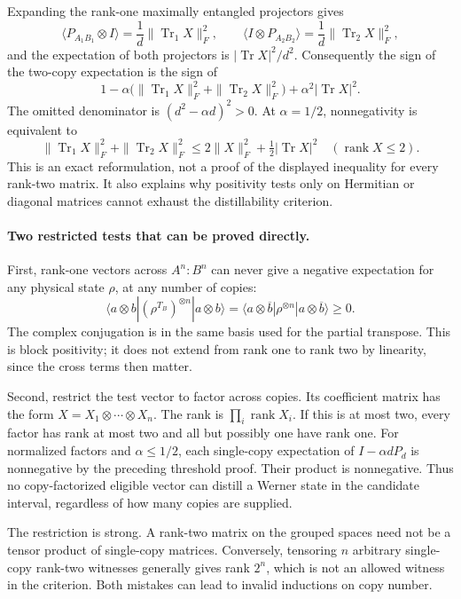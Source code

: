 \documentclass[11pt]{article}
\begin{document}
Expanding the rank-one maximally entangled projectors gives
\[
 \langle P_{A_1B_1}\otimes I\rangle
                  =\frac1d\|\operatorname{Tr}_1X\|_F^2,
 \qquad
 \langle I\otimes P_{A_2B_2}\rangle
                  =\frac1d\|\operatorname{Tr}_2X\|_F^2,
\]
and the expectation of both projectors is
$|\operatorname{Tr}X|^2/d^2$. Consequently the sign of the two-copy
expectation is the sign of
\begin{equation}\label{a276:twocopy}
 1-\alpha\bigl(\|\operatorname{Tr}_1X\|_F^2+
                    \|\operatorname{Tr}_2X\|_F^2\bigr)
                      +\alpha^2|\operatorname{Tr}X|^2.
\end{equation}
The omitted denominator is $(d^2-\alpha d)^2>0$.
At $\alpha=1/2$, nonnegativity is equivalent to
\[
 \|\operatorname{Tr}_1X\|_F^2+
 \|\operatorname{Tr}_2X\|_F^2
       \le2\|X\|_F^2+\tfrac12|\operatorname{Tr}X|^2
       \quad(\operatorname{rank}X\le2).
\]
This is an exact reformulation, not a proof of the displayed inequality
for every rank-two matrix. It also explains why positivity tests only
on Hermitian or diagonal matrices cannot exhaust the distillability
criterion.

\paragraph{Two restricted tests that can be proved directly.}
First, rank-one vectors across $A^n:B^n$ can never give a negative
expectation for any physical state $\rho$, at any number of copies:
\[
 \langle a\otimes b|(\rho^{T_B})^{\otimes n}|a\otimes b\rangle
 =\langle a\otimes\overline b|\rho^{\otimes n}
                              |a\otimes\overline b\rangle\ge0.
\]
The complex conjugation is in the same basis used for the partial
transpose. This is block positivity; it does not extend from rank one
to rank two by linearity, since the cross terms then matter.

Second, restrict the test vector to factor across copies. Its coefficient
matrix has the form $X=X_1\otimes\cdots\otimes X_n$. The rank is
$\prod_i\operatorname{rank}X_i$. If this is at most two, every factor
has rank at most two and all but possibly one have rank one.
For normalized factors and $\alpha\le1/2$, each single-copy expectation
of $I-\alpha dP_d$ is nonnegative by the preceding threshold proof.
Their product is nonnegative. Thus no copy-factorized eligible vector
can distill a Werner state in the candidate interval, regardless of
how many copies are supplied.

The restriction is strong. A rank-two matrix on the grouped spaces
need not be a tensor product of single-copy matrices. Conversely,
tensoring $n$ arbitrary single-copy rank-two witnesses generally gives
rank $2^n$, which is not an allowed witness in the criterion. Both
mistakes can lead to invalid inductions on copy number.
\end{document}
